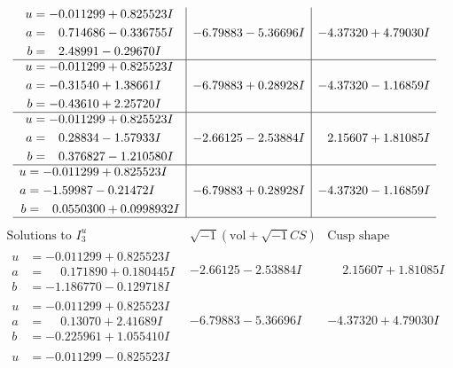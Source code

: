 \documentclass[1p]{elsarticle_modified}
\theoremstyle{definition}
\newcommand{\I}{\sqrt{-1}}
\begin{document}
$$\begin{array}{c|c|c}
\begin{aligned}
u &= -0.011299 + 0.825523 I \\
a &= \phantom{-}0.714686 - 0.336755 I \\
b &= \phantom{-}2.48991 - 0.29670 I\end{aligned}
 & -6.79883 - 5.36696 I & -4.37320 + 4.79030 I \\ \hline\begin{aligned}
u &= -0.011299 + 0.825523 I \\
a &= -0.31540 + 1.38661 I \\
b &= -0.43610 + 2.25720 I\end{aligned}
 & -6.79883 + 0.28928 I & -4.37320 - 1.16859 I \\ \hline\begin{aligned}
u &= -0.011299 + 0.825523 I \\
a &= \phantom{-}0.28834 - 1.57933 I \\
b &= \phantom{-}0.376827 - 1.210580 I\end{aligned}
 & -2.66125 - 2.53884 I & \phantom{-}2.15607 + 1.81085 I \\ \hline\begin{aligned}
u &= -0.011299 + 0.825523 I \\
a &= -1.59987 - 0.21472 I \\
b &= \phantom{-}0.0550300 + 0.0998932 I\end{aligned}
 & -6.79883 + 0.28928 I & -4.37320 - 1.16859 I\\
 \hline 
 \end{array}$$\newpage$$\begin{array}{c|c|c}  
\text{Solutions to }I^u_{3}& \I (\text{vol} + \sqrt{-1}CS) & \text{Cusp shape}\\
 \hline 
\begin{aligned}
u &= -0.011299 + 0.825523 I \\
a &= \phantom{-}0.171890 + 0.180445 I \\
b &= -1.186770 - 0.129718 I\end{aligned}
 & -2.66125 - 2.53884 I & \phantom{-}2.15607 + 1.81085 I \\ \hline\begin{aligned}
u &= -0.011299 + 0.825523 I \\
a &= \phantom{-}0.13070 + 2.41689 I \\
b &= -0.225961 + 1.055410 I\end{aligned}
 & -6.79883 - 5.36696 I & -4.37320 + 4.79030 I \\ \hline\begin{aligned}
u &= -0.011299 - 0.825523 I \\

\end{aligned}
\end{array}$$
\end{document}
